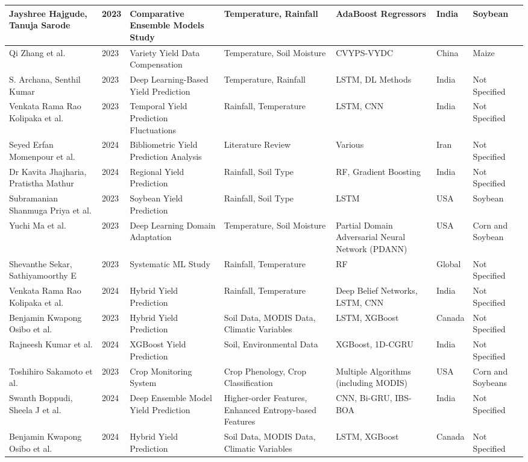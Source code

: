 \documentclass[conference]{IEEEtran}
\begin{document}
\begin{table}[htbp]
\begin{adjustbox}{width=\textwidth}
\begin{tabular}{|p{3cm}|p{1cm}|p{3cm}|p{3cm}|p{3cm}|p{1cm}|p{2cm}|}
\hline
Jayshree Hajgude, Tanuja Sarode & 2023 & Comparative Ensemble Models Study & Temperature, Rainfall & AdaBoost Regressors & India & Soybean\\
\hline
Qi Zhang et al. & 2023 & Variety Yield Data Compensation & Temperature, Soil Moisture & CVYPS-VYDC & China & Maize \\
\hline
S. Archana, Senthil Kumar & 2023 & Deep Learning-Based Yield Prediction & Temperature, Rainfall & LSTM, DL Methods & India & Not Specified\\
\hline
Venkata Rama Rao Kolipaka et al. & 2023 & Temporal Yield Prediction Fluctuations & Rainfall, Temperature & LSTM, CNN & India & Not Specified\\
\hline
Seyed Erfan Momenpour et al. & 2024 & Bibliometric Yield Prediction Analysis & Literature Review & Various & Iran & Not Specified\\
\hline
Dr Kavita Jhajharia, Pratistha Mathur & 2024 & Regional Yield Prediction & Rainfall, Soil Type & RF, Gradient Boosting & India & Not Specified\\
\hline
Subramanian Shanmuga Priya et al. & 2023 & Soybean Yield Prediction & Rainfall, Soil Type & LSTM & USA & Soybean\\
\hline
Yuchi Ma et al. & 2023 & Deep Learning Domain Adaptation & Temperature, Soil Moisture & Partial Domain Adversarial Neural Network (PDANN) & USA & Corn and Soybean\\
\hline
Shevanthe Sekar, Sathiyamoorthy E & 2023 & Systematic ML Study & Rainfall, Temperature & RF & Global & Not Specified\\
\hline
Venkata Rama Rao Kolipaka et al. & 2024 & Hybrid Yield Prediction & Rainfall, Temperature & Deep Belief Networks, LSTM, CNN & India & Not Specified\\
\hline
Benjamin Kwapong Osibo et al. & 2023 & Hybrid Yield Prediction & Soil Data, MODIS Data, Climatic Variables & LSTM, XGBoost & Canada & Not Specified\\
\hline
Rajneesh Kumar et al. & 2024 & XGBoost Yield Prediction & Soil, Environmental Data & XGBoost, 1D-CGRU & India & Not Specified\\
\hline
Toshihiro Sakamoto et al. & 2023 & Crop Monitoring System & Crop Phenology, Crop Classification & Multiple Algorithms (including MODIS) & USA & Corn and Soybeans\\
\hline
Swanth Boppudi, Sheela J et al. & 2024 & Deep Ensemble Model Yield Prediction & Higher-order Features, Enhanced Entropy-based Features & CNN, Bi-GRU, IBS-BOA & India & Not Specified\\
\hline
Benjamin Kwapong Osibo et al. & 2024 & Hybrid Yield Prediction & Soil Data, MODIS Data, Climatic Variables & LSTM, XGBoost & Canada & Not Specified\\
\hline
\end{tabular}
\end{adjustbox}
\label{table:summary}
\end{table}
\end{document}
